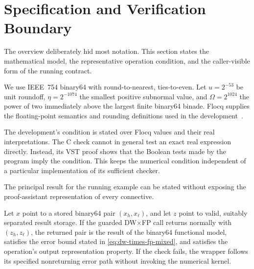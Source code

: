 \section{Specification and Verification Boundary}
\label{sec:specification}

The overview deliberately hid most notation.  This section states the
mathematical model, the representative operation condition, and the
caller-visible form of the running contract.

We use IEEE~754 binary64 with round-to-nearest, ties-to-even.  Let
$u=2^{-53}$ be unit roundoff, $\eta=2^{-1074}$ the smallest positive
subnormal value, and $\Omega=2^{1024}$ the power of two immediately above the
largest finite binary64 binade.  Flocq supplies the floating-point semantics
and rounding definitions used in the development~\cite{Boldo2011}.


The development's condition is stated over Flocq values and their real
interpretations.  The C check cannot in general test an exact real expression
directly.  Instead, its VST proof shows that the Boolean tests made by the
program imply the condition.  This keeps the numerical condition independent
of a particular implementation of its sufficient checker.

The principal result for the running example can be stated without exposing
the proof-assistant representation of every connective.

\begin{theorem}
\label{thm:guarded-dw-times-fp}
Let $x$ point to a stored binary64 pair $(x_h,x_\ell)$, and let $z$ point to
valid, suitably separated result storage.  If the guarded DW$\times$FP call
returns normally with $(z_h,z_\ell)$, the returned pair is the result of the
binary64 functional model, satisfies the error bound stated in
\eqref{eq:dw-times-fp-mixed}, and satisfies the operation's output representation
property.  If the check fails, the wrapper follows its specified nonreturning
error path without invoking the numerical kernel.
\end{theorem}

